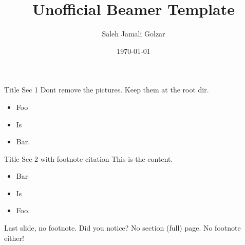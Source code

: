 \documentclass{beamer}
\title{Unofficial Beamer Template}
\author{Saleh Jamali Golzar}
\date{\today}
\begin{document}

    \begin{frame}{Title Sec 1}
        Dont remove the pictures. Keep them at the root dir.
        \begin{itemize}
            \item Foo
            \item Is
            \item Bar.
        \end{itemize}
    \end{frame}


    \begin{frame}{Title Sec 2 with footnote citation }
        This is the content.
        \begin{itemize}
            \item Bar
            \item Is
            \item Foo.
        \end{itemize}
    \end{frame}

    \footertext{}
    \begin{frame}{Last slide, no footnote.}
        Did you notice? No section (full) page. No footnote either!
    \end{frame}
\end{document}
